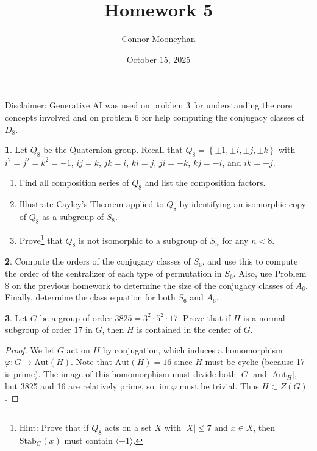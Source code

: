 \documentclass[12pt]{article}
\title{Homework 5}
\author{Connor Mooneyhan}
\date{October 15, 2025}
\DeclareMathOperator{\im}{im}
\theoremstyle{definition}
\newtheorem{ex}{}
\begin{document}
\maketitle

Disclaimer: Generative AI was used on problem 3 for understanding the core concepts involved and on problem 6 for help computing the conjugacy classes of $D_8$.

\begin{ex}
	Let $Q_8$ be the Quaternion group.
	Recall that $Q_8 = \left\lbrace  \pm 1, \pm i, \pm j, \pm k \right\rbrace$ with $i^2 = j^2 = k^2 = -1$, $ij = k$, $jk = i$, $ki = j$, $ji = -k$, $kj = -i$, and $ik = -j$.
	\begin{enumerate}[label=(\alph*)]
		\item Find all composition series of $Q_8$ and list the composition factors.
		\item Illustrate Cayley's Theorem applied to $Q_8$ by identifying an isomorphic copy of $Q_8$ as a subgroup of $S_8$.
		\item Prove\footnote{Hint: Prove that if $Q_8$ acts on a set $X$ with $|X| \leq 7$ and $x \in X$, then $\mathrm{Stab}_G(x)$ must contain $\langle -1 \rangle$.} that $Q_8$ is not isomorphic to a subgroup of $S_n$ for any $n < 8$.
	\end{enumerate}
\end{ex}

\begin{ex}
	Compute the orders of the conjugacy classes of $S_6$, and use this to compute the order of the centralizer of each type of permutation in $S_6$.
	Also, use Problem 8 on the previous homework to determine the size of the conjugacy classes of $A_6$.
	Finally, determine the class equation for both $S_6$ and $A_6$.
\end{ex}

\begin{ex}
	Let $G$ be a group of order $3825 = 3^2 \cdot 5^2 \cdot 17$.
	Prove that if $H$ is a normal subgroup of order $17$ in $G$, then $H$ is contained in the center of $G$.
\end{ex}
\begin{proof}
  We let $G$ act on $H$ by conjugation, which induces a homomorphism $\varphi : G \to \mathrm{Aut}(H)$.
  Note that $\mathrm{Aut}(H) = 16$ since $H$ must be cyclic (because 17 is prime).
  The image of this homomorphism must divide both $|G|$ and $|\mathrm{Aut}_H|$, but 3825 and 16 are relatively prime, so $\im \varphi$ must be trivial.
  Thus $H \subset Z(G)$.
\end{proof}
\end{document}
